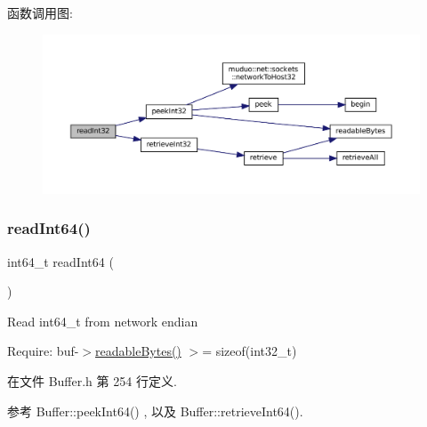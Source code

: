 函数调用图\+:
\nopagebreak
\begin{figure}[H]
\begin{center}
\leavevmode
\includegraphics[width=350pt]{classmuduo_1_1net_1_1Buffer_adbc23fa2b53ee3f0bd8cc0af521900d4_cgraph}
\end{center}
\end{figure}
\mbox{\label{classmuduo_1_1net_1_1Buffer_a5b815d6984b81ae01f581f799c48582f}} 
\subsubsection{\texorpdfstring{read\+Int64()}{readInt64()}}
{\footnotesize\ttfamily int64\+\_\+t read\+Int64 (\begin{DoxyParamCaption}{ }\end{DoxyParamCaption})\hspace{0.3cm}{\ttfamily [inline]}}

Read int64\+\_\+t from network endian

Require\+: buf-\/$>$\hyperlink{classmuduo_1_1net_1_1Buffer_afba1d23196411daa43950fdbbff6d724}{readable\+Bytes()} $>$= sizeof(int32\+\_\+t) 

在文件 Buffer.\+h 第 254 行定义.



参考 Buffer\+::peek\+Int64() , 以及 Buffer\+::retrieve\+Int64().

